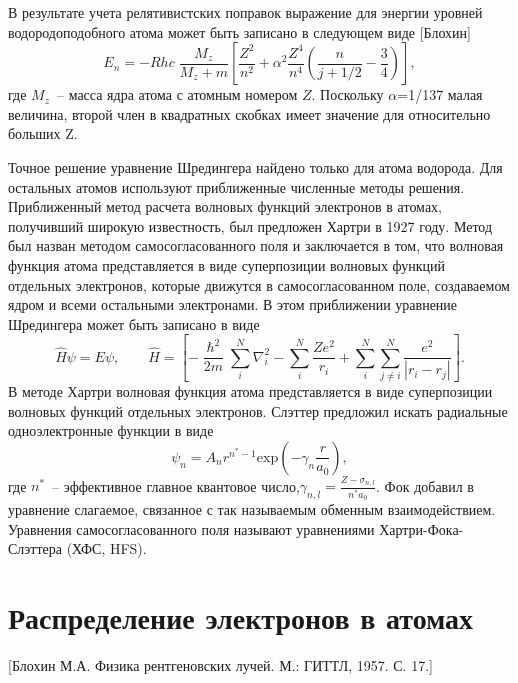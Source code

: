\documentclass[a4paper,14pt, openany, twoside, draft]{extbook} %
\begin{document}
В результате учета релятивистских поправок выражение для энергии уровней водородоподобного атома может быть записано в следующем виде [Блохин]
\begin{equation}
\label{eq:2.24}
E_n=-Rhc\;\frac{M_z}{M_z+m}\left[\frac{Z^2}{n^2}+\alpha^2\frac{Z^4}{n^4}\left(\frac{n}{j+1/2}-\frac{3}{4}\right)\right],
\end{equation}
где $M_z$~-- масса ядра атома с атомным номером $Z$.  Поскольку ${\alpha}$=1/137 малая величина, второй член в квадратных скобках имеет значение для относительно больших Z.

Точное решение уравнение Шредингера найдено только для атома водорода.  Для остальных атомов используют приближенные численные методы решения.  Приближенный метод расчета волновых функций электронов в атомах, получивший широкую известность, был предложен Хартри в 1927 году.  Метод был назван методом самосогласованного поля и заключается в том, что волновая функция атома представляется в виде суперпозиции волновых функций отдельных электронов, которые движутся в самосогласованном поле, создаваемом ядром и всеми остальными электронами.  В этом приближении уравнение Шредингера может быть записано в виде
\begin{equation}
\label{eq:energylevel}
\hat H\psi=\mathit{E\psi},\qquad\hat H=\left[-\frac{\hslash^2}{2m}\overset N{\underset i{\sum }}\nabla_i^2-\overset N{\underset i{\sum }}\frac{Ze^2}{r_i}+\overset N{\underset i{\sum}}\overset N{\underset{j\neq i}{\sum}}\frac{e^2}{|r_i-r_j|}\right].
\end{equation}
В методе Хартри волновая функция атома представляется в виде суперпозиции волновых функций отдельных электронов.  Слэттер предложил искать радиальные одноэлектронные функции в виде
\begin{equation}
\label{eq:energylevel}
\psi_n=A_nr^{n^\ast -1}\text{exp}(-\gamma_n\frac {r}{a_0}),
\end{equation}
где  $n^\ast$~-- эффективное главное квантовое число,\;$\gamma_{n,l}=\frac{Z-\sigma_{n,l}}{n^\ast a_0}$.
Фок добавил в уравнение слагаемое, связанное с так называемым обменным взаимодействием.  Уравнения самосогласованного поля называют уравнениями Хартри-Фока-Слэттера (ХФС, HFS).

\section{Распределение электронов в атомах}
\label{sec:electron-in-athoms}
[Блохин М.А. Физика рентгеновских лучей. М.: ГИТТЛ, 1957. С. 17.]
\end{document}
